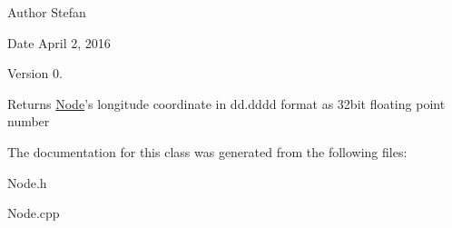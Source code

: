 \begin{DoxyAuthor}{Author}
Stefan 
\end{DoxyAuthor}
\begin{DoxyDate}{Date}
April 2, 2016 
\end{DoxyDate}
\begin{DoxyVersion}{Version}
0.
\end{DoxyVersion}
\begin{DoxyReturn}{Returns}
\hyperlink{classNode}{Node}'s longitude coordinate in dd.\-dddd format as 32bit floating point number 
\end{DoxyReturn}


The documentation for this class was generated from the following files\-:\begin{DoxyCompactItemize}
\item 
Node.\-h\item 
Node.\-cpp\end{DoxyCompactItemize}

